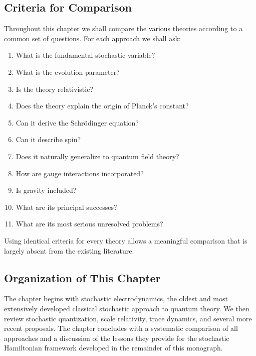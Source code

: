 \subsection{Criteria for Comparison}
Throughout this chapter we shall compare the various theories according
to a common set of questions.
For each approach we shall ask:
\begin{enumerate}
\item What is the fundamental stochastic variable?
\item What is the evolution parameter?
\item Is the theory relativistic?
\item Does the theory explain the origin of Planck's constant?
\item Can it derive the Schrödinger equation?
\item Can it describe spin?
\item Does it naturally generalize to quantum field theory?
\item How are gauge interactions incorporated?
\item Is gravity included?
\item What are its principal successes?
\item What are its most serious unresolved problems?
\end{enumerate}
Using identical criteria for every theory allows a meaningful comparison
that is largely absent from the existing literature.
\subsection{Organization of This Chapter}
The chapter begins with stochastic electrodynamics, the oldest and most
extensively developed classical stochastic approach to quantum theory.
We then review stochastic quantization, scale relativity, trace
dynamics, and several more recent proposals.
The chapter concludes with a systematic comparison of all approaches and
a discussion of the lessons they provide for the stochastic
Hamiltonian framework developed in the remainder of this monograph.
